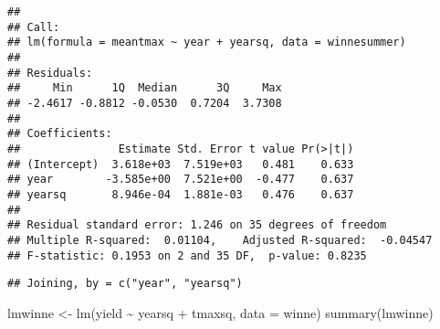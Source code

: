 \documentclass[
]{book}
\newenvironment{Shaded}{\begin{snugshade}}{\end{snugshade}}
\newcommand{\AttributeTok}[1]{\textcolor[rgb]{0.77,0.63,0.00}{#1}}
\newcommand{\CommentTok}[1]{\textcolor[rgb]{0.56,0.35,0.01}{\textit{#1}}}
\newcommand{\DecValTok}[1]{\textcolor[rgb]{0.00,0.00,0.81}{#1}}
\newcommand{\FunctionTok}[1]{\textcolor[rgb]{0.00,0.00,0.00}{#1}}
\newcommand{\NormalTok}[1]{#1}
\newcommand{\OtherTok}[1]{\textcolor[rgb]{0.56,0.35,0.01}{#1}}
\newcommand{\SpecialCharTok}[1]{\textcolor[rgb]{0.00,0.00,0.00}{#1}}
\begin{document}
\begin{Shaded}
\end{Shaded}

\begin{verbatim}
## 
## Call:
## lm(formula = meantmax ~ year + yearsq, data = winnesummer)
## 
## Residuals:
##     Min      1Q  Median      3Q     Max 
## -2.4617 -0.8812 -0.0530  0.7204  3.7308 
## 
## Coefficients:
##               Estimate Std. Error t value Pr(>|t|)
## (Intercept)  3.618e+03  7.519e+03   0.481    0.633
## year        -3.585e+00  7.521e+00  -0.477    0.637
## yearsq       8.946e-04  1.881e-03   0.476    0.637
## 
## Residual standard error: 1.246 on 35 degrees of freedom
## Multiple R-squared:  0.01104,    Adjusted R-squared:  -0.04547 
## F-statistic: 0.1953 on 2 and 35 DF,  p-value: 0.8235
\end{verbatim}

\begin{Shaded}
\end{Shaded}

\begin{verbatim}
## Joining, by = c("year", "yearsq")
\end{verbatim}

\begin{Shaded}
\begin{Highlighting}[]
\NormalTok{lmwinne }\OtherTok{\textless{}{-}} \FunctionTok{lm}\NormalTok{(yield }\SpecialCharTok{\textasciitilde{}}\NormalTok{ yearsq }\SpecialCharTok{+}\NormalTok{ tmaxsq, }\AttributeTok{data =}\NormalTok{ winne)}
\FunctionTok{summary}\NormalTok{(lmwinne)}
\end{Highlighting}
\end{Shaded}
\end{document}
